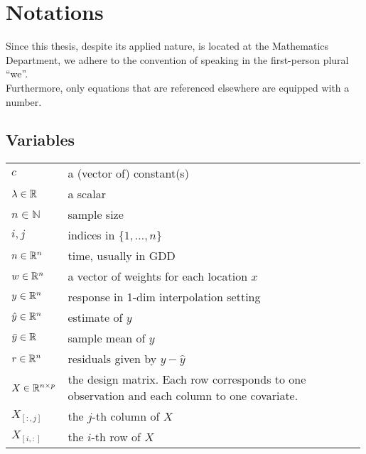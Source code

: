 \chapter*{\vspace{-3.2cm} Notations}
\label{c:Notation}
\vspace{-0.6cm}
Since this thesis, despite its applied nature, is located at the Mathematics Department, we adhere to the convention of speaking in the first-person plural ``we''.\\
Furthermore, only equations that are referenced elsewhere are equipped with a number.

\section*{Variables}\vspace{-0.2cm}
\renewcommand{\arraystretch}{1.3} %
\begin{longtable}{p{0.12\linewidth} p{0.87\linewidth}}
$c$		& a (vector of) constant(s)\\
$\lambda \in \mathbb{R}$		& a scalar\\
$n\in \mathbb{N}$		& sample size\\
$i,j$		& indices in $\{1,\dots,n\}$\\
$n\in \mathbb{R}^n$		& time, usually in GDD\\
$w \in \mathbb{R}^n$		& a vector of weights for each location $x$\\
$y\in \mathbb{R}^n$		& response in 1-dim interpolation setting\\
$\hat y\in \mathbb{R}^n$		& estimate of $y$\\
$\bar y\in \mathbb{R}$		& sample mean of $y$\\
$r \in \mathbb{R}^n$		& residuals given by $y - \hat y$\\
$X\in\mathbb{R}^{n\times p}$ & the design matrix. Each row corresponds to one observation and each column to one covariate.\\
$X_{[:,j]}$ 	& the $j$-th column of $X$\\
$X_{[i,:]}$ 	& the $i$-th row of $X$
\end{longtable}

